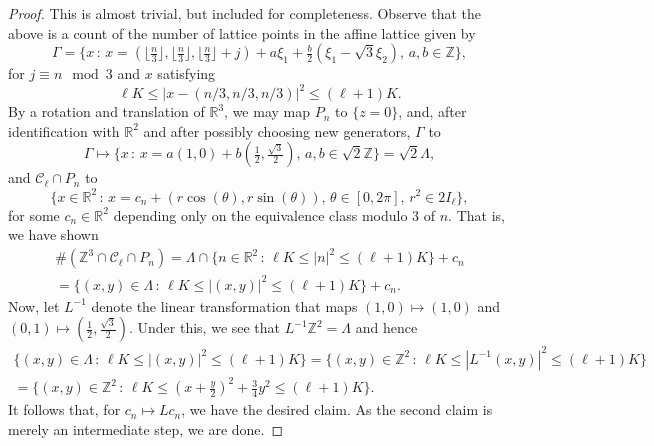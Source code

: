 \documentclass[12pt, letterpaper]{amsart}
\begin{document}
\begin{proof}
    This is almost trivial, but included for completeness. Observe that the above is a count of the number of lattice points in the affine lattice given by 
    \[
    \Gamma = \{x\,:\, x = (\lfloor\tfrac{n}{3}\rfloor,\lfloor\tfrac{n}{3}\rfloor,\lfloor\tfrac{n}{3}\rfloor + j) + a\xi_1 + \tfrac{b}{2}(\xi_1-\sqrt{3}\xi_2),\,a,b\in\mathbb{Z}\},
    \]
    for $j\equiv n\mod 3$ and $x$ satisfying 
    \[
        \ell K\leq |x-(n/3, n/3, n/3)|^2\leq (\ell+1)K.
    \]
    By a rotation and translation of $\mathbb{R}^3$, we may map $P_n$ to $\{z = 0\}$, and, after identification with $\mathbb{R}^2$ and after possibly choosing new generators,  $\Gamma$ to
    \[
    \Gamma \mapsto \{x\,:\, x = a(1,0) + b(\tfrac{1}{2},\tfrac{\sqrt{3}}{2}),\,a,b\in\sqrt{2}\mathbb{Z}\} = \sqrt{2}\Lambda,
    \]
    and $\mathcal{C}_\ell\cap P_n$ to
    \[
        \{x\in\mathbb{R}^2\,:\,x = c_n + (r\cos(\theta), r\sin(\theta)),\,\theta\in[0,2\pi],\,r^2\in 2I_\ell\},
    \]
    for some $c_n\in\mathbb{R}^2$ depending only on the equivalence class modulo $3$ of $n$. That is, we have shown
    \begin{multline*}
    \#(\mathbb{Z}^3\cap \mathcal{C}_\ell\cap P_n) = \Lambda\cap\{n\in\mathbb{R}^2\,:\,\ell K\leq |n|^2\leq (\ell+1)K\} +c_n\\
    = \{(x,y)\in\Lambda\,:\,\ell K\leq |(x,y)|^2\leq (\ell+1)K\} + c_n.
    \end{multline*}
    Now, let $L^{-1}$ denote the linear transformation that maps $(1,0)\mapsto (1,0)$ and $(0,1)\mapsto (\tfrac12, \tfrac{\sqrt{3}}{2})$. Under this, we see that $L^{-1}\mathbb{Z}^2 = \Lambda$ and hence
    \begin{multline*}
        \{(x,y)\in \Lambda\,:\,\ell K\leq |(x,y)|^2\leq (\ell+1)K\} = \{(x,y)\in\mathbb{Z}^2\,:\,\ell K\leq |L^{-1}(x,y)|^2\leq (\ell+1)K\}\\
        =\{(x,y)\in\mathbb{Z}^2\,:\,\ell K\leq (x+\tfrac{y}{2})^2+\tfrac34 y^2\leq (\ell+1)K\}.
    \end{multline*}
    It follows that, for $c_n\mapsto Lc_n$, we have the desired claim. As the second claim is merely an intermediate step, we are done.
\end{proof}
\end{document}
